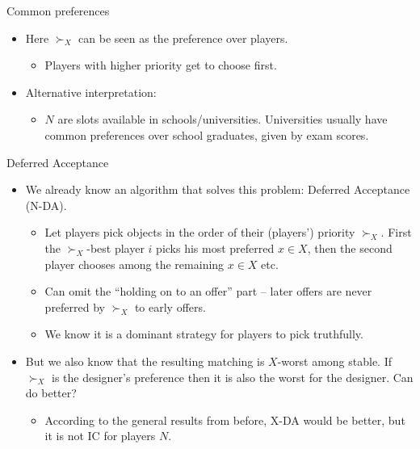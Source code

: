 \documentclass[english,10pt
,aspectratio=169
]{beamer}
\begin{document}
\begin{frame}{Common preferences}
\begin{itemize}
	\item Here $\succ_X$ can be seen as the  preference over players.
	\begin{itemize}
		\item Players with higher priority get to choose first.
	\end{itemize}
	\item Alternative interpretation:
	\begin{itemize}
		\item $N$ are slots available in schools/universities. Universities usually have common preferences over school graduates, given by exam scores.
	\end{itemize}
\end{itemize}
\end{frame}


\begin{frame}{Deferred Acceptance}
\begin{itemize}
	\item We already know an algorithm that solves this problem: Deferred Acceptance (N-DA).
	\begin{itemize}
		\item Let players pick objects in the order of their (players') priority $\succ_X$. First the $\succ_X$-best player $i$ picks his most preferred $x \in X$, then the second player chooses among the remaining $x \in X$ etc.
		\item Can omit the ``holding on to an offer'' part -- later offers are never preferred by $\succ_X$ to early offers.
		\item We know it is a dominant strategy for players to pick truthfully.
	\end{itemize}
	\item But we also know that the resulting matching is $X$-worst among stable. If $\succ_X$ is the designer's preference then it is also the worst for the designer. Can do better?
	\begin{itemize}
		\item According to the general results from before, X-DA would be better, but it is not IC for players $N$.
	\end{itemize}
\end{itemize}
\end{frame}
\end{document}
